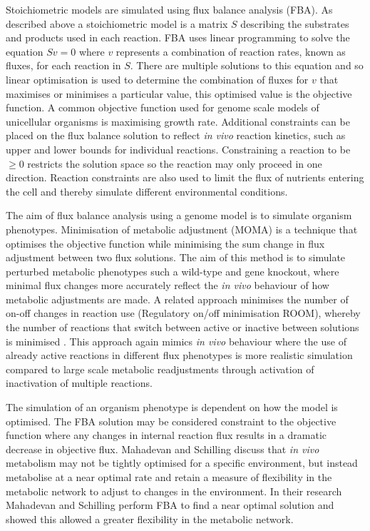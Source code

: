 Stoichiometric models are simulated using flux balance analysis (FBA). As described above a stoichiometric model is a matrix $S$ describing the substrates and products used in each reaction. FBA uses linear programming to solve the equation $S v = 0$ where $v$ represents a combination of reaction rates, known as fluxes, for each reaction in $S$. There are multiple solutions to this equation and so linear optimisation is used to determine the combination of fluxes for $v$ that maximises or minimises a particular value, this optimised value is the objective function. A common objective function used for genome scale models of unicellular organisms is maximising growth rate. Additional constraints can be placed on the flux balance solution to reflect \emph{in vivo} reaction kinetics, such as upper and lower bounds for individual reactions. Constraining a reaction to be $\geq 0$ restricts the solution space so the reaction may only proceed in one direction. Reaction constraints are also used to limit the flux of nutrients entering the cell and thereby simulate different environmental conditions.

The aim of flux balance analysis using a genome model is to simulate organism phenotypes. Minimisation of metabolic adjustment (MOMA) \cite{segre2002,burgard2003} is a technique that optimises the objective function while minimising the sum change in flux adjustment between two flux solutions. The aim of this method is to simulate perturbed metabolic phenotypes such a wild-type and gene knockout, where minimal flux changes more accurately reflect the \emph{in vivo} behaviour of how metabolic adjustments are made. A related approach minimises the number of on-off changes in reaction use (Regulatory on/off minimisation ROOM), whereby the number of reactions that switch between active or inactive between solutions is minimised \cite{shlomi2005}. This approach again mimics \emph{in vivo} behaviour where the use of already active reactions in different flux phenotypes is more realistic simulation compared to large scale metabolic readjustments through activation of inactivation of multiple reactions.

The simulation of an organism phenotype is dependent on how the model is optimised. The FBA solution may be considered constraint to the objective function where any changes in internal reaction flux results in a dramatic decrease in objective flux. Mahadevan and Schilling \cite{mahadevan2003} discuss that \emph{in vivo} metabolism may not be tightly optimised for a specific environment, but instead metabolise at a near optimal rate and retain a measure of flexibility in the metabolic network to adjust to changes in the environment. In their research Mahadevan and Schilling perform FBA to find a near optimal solution and showed this allowed a greater flexibility in the metabolic network.

